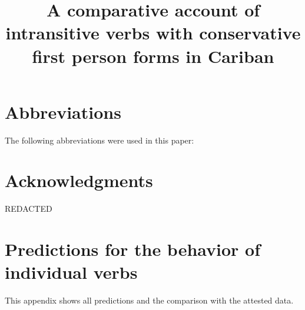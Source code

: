 \title{A comparative account of intransitive verbs with conservative first person forms in Cariban}
\date{}


%

%







\section{Abbreviations}
The following abbreviations were used in this paper: \glossingAbbrevsList
\section{Acknowledgments}
REDACTED

\printbibliography

\newpage
\appendix
\section{Predictions for the behavior of individual verbs}
\FloatBarrier
This appendix shows all predictions and the comparison with the attested data.















